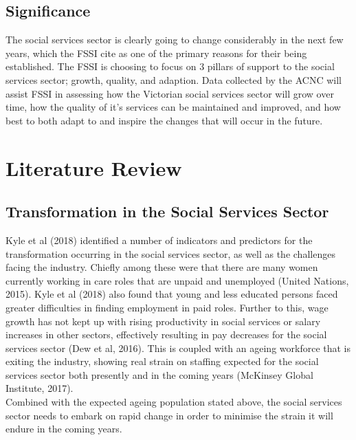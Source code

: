\documentclass[
  11pt,
]{article}
\begin{document}
\hypertarget{significance}{%
\subsection{Significance}\label{significance}}

The social services sector is clearly going to change considerably in the next few years, which the FSSI cite as one of the primary reasons for their being established. The FSSI is choosing to focus on 3 pillars of support to the social services sector; growth, quality, and adaption. Data collected by the ACNC will assist FSSI in assessing how the Victorian social services sector will grow over time, how the quality of it's services can be maintained and improved, and how best to both adapt to and inspire the changes that will occur in the future.

\hypertarget{literature-review}{%
\section{Literature Review}\label{literature-review}}

\hypertarget{transformation-in-the-social-services-sector}{%
\subsection{Transformation in the Social Services Sector}\label{transformation-in-the-social-services-sector}}

Kyle et al (2018) identified a number of indicators and predictors for the transformation occurring in the social services sector, as well as the challenges facing the industry. Chiefly among these were that there are many women currently working in care roles that are unpaid and unemployed (United Nations, 2015). Kyle et al (2018) also found that young and less educated persons faced greater difficulties in finding employment in paid roles. Further to this, wage growth has not kept up with rising productivity in social services or salary increases in other sectors, effectively resulting in pay decreases for the social services sector (Dew et al, 2016). This is coupled with an ageing workforce that is exiting the industry, showing real strain on staffing expected for the social services sector both presently and in the coming years (McKinsey Global Institute, 2017).\\
Combined with the expected ageing population stated above, the social services sector needs to embark on rapid change in order to minimise the strain it will endure in the coming years.
\end{document}

